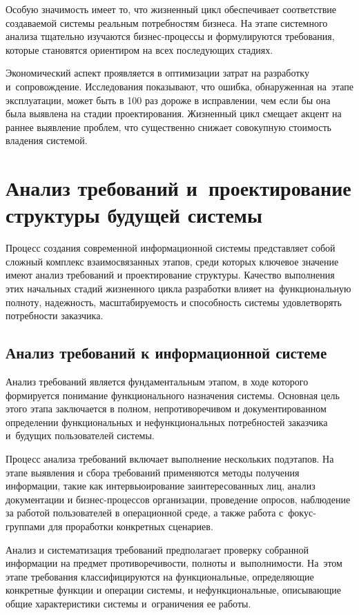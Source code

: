 \documentclass{ou}
\begin{document}
Особую значимость имеет то, что жизненный цикл обеспечивает соответствие создаваемой системы реальным потребностям бизнеса. На этапе системного анализа тщательно изучаются бизнес-процессы и формулируются требования, которые становятся ориентиром на всех последующих стадиях. 

Экономический аспект проявляется в оптимизации затрат на разработку и~сопровождение. Исследования показывают, что ошибка, обнаруженная на~этапе эксплуатации, может быть в 100 раз дороже в исправлении, чем если бы она была выявлена на стадии проектирования. Жизненный цикл смещает акцент на раннее выявление проблем, что существенно снижает совокупную стоимость владения системой\cite{pis_lecture}.
\newpage
\section{Анализ требований и~проектирование структуры будущей системы}
Процесс создания современной информационной системы представляет собой сложный комплекс взаимосвязанных этапов, среди которых ключевое значение имеют анализ требований и проектирование структуры. Качество выполнения этих начальных стадий жизненного цикла разработки влияет на~функциональную полноту, надежность, масштабируемость и способность системы удовлетворять потребности заказчика.
\subsection{Анализ требований к информационной системе}
Анализ требований является фундаментальным этапом, в ходе которого формируется понимание функционального назначения системы. Основная цель этого этапа заключается в полном, непротиворечивом и документированном определении функциональных и нефункциональных потребностей заказчика и~будущих пользователей системы.

Процесс анализа требований включает выполнение нескольких подэтапов. На этапе выявления и сбора требований применяются методы получения информации, такие как интервьюирование заинтересованных лиц, анализ документации и бизнес-процессов организации, проведение опросов, наблюдение за работой пользователей в операционной среде, а также работа с~фокус-группами для проработки конкретных сценариев.

Анализ и систематизация требований предполагает проверку собранной информации на предмет противоречивости, полноты и~выполнимости. На~этом этапе требования классифицируются на функциональные, определяющие конкретные функции и операции системы, и нефункциональные, описывающие общие характеристики системы и~ограничения ее работы.
\end{document}
